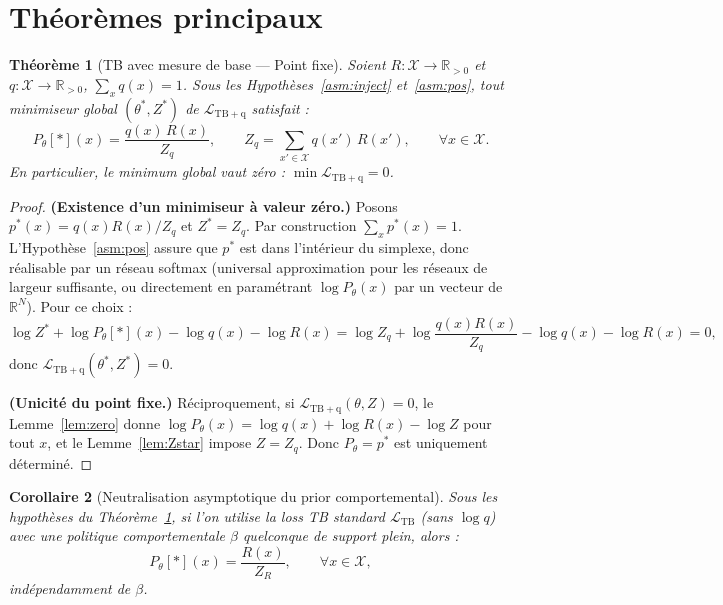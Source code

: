 \documentclass[11pt,a4paper]{article}
\theoremstyle{plain}
\newtheorem{theorem}{Théorème}[section]
\newtheorem{corollary}[theorem]{Corollaire}
\theoremstyle{definition}
\theoremstyle{remark}
\newcommand{\R}{\mathbb{R}}
\newcommand{\calX}{\mathcal{X}}
\newcommand{\calL}{\mathcal{L}}
\newcommand{\logZ}{\log Z}
\newcommand{\pth}{P_\theta}
\begin{document}
\section{Théorèmes principaux}
\label{sec:theorems}

\begin{mainbox}
\begin{theorem}[TB avec mesure de base — Point fixe]
\label{thm:main}
Soient $R : \calX \to \R_{>0}$ et $q : \calX \to \R_{>0}$, $\sum_x q(x) = 1$.
Sous les Hypothèses~\ref{asm:inject} et~\ref{asm:pos},
tout minimiseur global $(\theta^*, Z^*)$ de $\calL_{\mathrm{TB+q}}$ satisfait :
\begin{equation}
  \pth[*](x) = \frac{q(x)\,R(x)}{Z_q},
  \qquad Z_q = \sum_{x' \in \calX} q(x')\,R(x'),
  \qquad \forall x \in \calX.
\end{equation}
En particulier, le minimum global vaut zéro : $\min \calL_{\mathrm{TB+q}} = 0$.
\end{theorem}
\end{mainbox}

\begin{proof}
\textbf{(Existence d'un minimiseur à valeur zéro.)}
Posons $p^*(x) = q(x)R(x)/Z_q$ et $Z^* = Z_q$.
Par construction $\sum_x p^*(x) = 1$.
L'Hypothèse~\ref{asm:pos} assure que $p^*$ est dans l'intérieur du simplexe,
donc réalisable par un réseau softmax (universal approximation pour les réseaux
de largeur suffisante, ou directement en paramétrant $\log\pth(x)$ par un
vecteur de $\R^N$). Pour ce choix :
\begin{equation}
  \logZ^* + \log\pth[*](x) - \log q(x) - \log R(x)
  = \log Z_q + \log\frac{q(x)R(x)}{Z_q} - \log q(x) - \log R(x) = 0,
\end{equation}
donc $\calL_{\mathrm{TB+q}}(\theta^*, Z^*) = 0$.

\textbf{(Unicité du point fixe.)}
Réciproquement, si $\calL_{\mathrm{TB+q}}(\theta, Z) = 0$,
le Lemme~\ref{lem:zero} donne $\log\pth(x) = \log q(x) + \log R(x) - \logZ$
pour tout $x$, et le Lemme~\ref{lem:Zstar} impose $Z = Z_q$.
Donc $\pth = p^*$ est uniquement déterminé.
\end{proof}

\begin{corrbox}
\begin{corollary}[Neutralisation asymptotique du prior comportemental]
\label{cor:behav}
Sous les hypothèses du Théorème~\ref{thm:main}, si l'on utilise la loss
TB standard $\calL_{\mathrm{TB}}$ (sans $\log q$) avec une politique
comportementale $\beta$ quelconque de support plein, alors :
\begin{equation}
  \pth[*](x) = \frac{R(x)}{Z_R}, \qquad \forall x \in \calX,
\end{equation}
indépendamment de $\beta$.
\end{corollary}
\end{corrbox}
\end{document}
